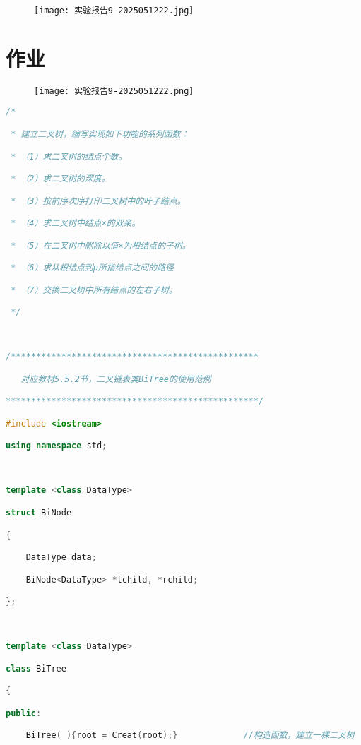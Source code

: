 \begin{figure}[H]
\centering
\texttt{[image: 实验报告9-2025051222.jpg]}
\label{}
\end{figure}

\section{作业}

\begin{figure}[H]
\centering
\texttt{[image: 实验报告9-2025051222.png]}
\label{}
\end{figure}

\begin{lstlisting}[language=C++]
/*

 * 建立二叉树，编写实现如下功能的系列函数：

 * （1）求二叉树的结点个数。

 * （2）求二叉树的深度。

 * （3）按前序次序打印二叉树中的叶子结点。

 * （4）求二叉树中结点×的双亲。

 * （5）在二叉树中删除以值×为根结点的子树。

 * （6）求从根结点到p所指结点之间的路径

 * （7）交换二叉树中所有结点的左右子树。

 */

  

/*************************************************

   对应教材5.5.2节，二叉链表类BiTree的使用范例

**************************************************/

#include <iostream>

using namespace std;

  

template <class DataType>

struct BiNode

{

    DataType data;

    BiNode<DataType> *lchild, *rchild;

};

  

template <class DataType>

class BiTree

{

public:

    BiTree( ){root = Creat(root);}             //构造函数，建立一棵二叉树


\end{lstlisting}
